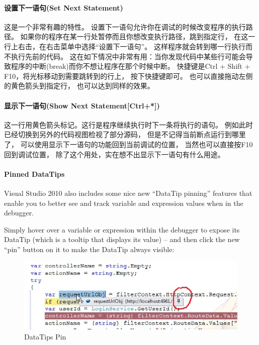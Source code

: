 \documentclass{book}
\begin{document}
\paragraph{设置下一语句(Set Next Statement)}这是一个非常有趣的特性。
设置下一语句允许你在调试的时候改变程序的执行路径。
如果你的程序在某一行处暂停而且你想改变执行路径，跳到指定行，
在这一行上右击，在右击菜单中选择“设置下一语句”。
这样程序就会转到哪一行执行而不执行先前的代码。
这在如下情况中非常有用：当你发现代码中某些行可能会导致程序的中断(break)而你不想让程序在那个时候中断。
快捷键是Ctrl + Shift + F10，将光标移动到需要跳转到的行上，
按下快捷键即可。
也可以直接拖动左侧的黄色箭头到指定行，
也可以达到同样的效果。

\paragraph{显示下一语句(Show Next Statement[Ctrl+*])}
这一行用黄色箭头标记。这行是程序继续执行时下一条将执行的语句。
例如此时已经切换到另外的代码视图检视了部分源码，
但是不记得当前断点运行到哪里了，
可以使用显示下一语句的功能回到当前调试的位置，
当然也可以直接按F10回到调试位置，
除了这个用处，实在想不出显示下一语句有什么用途。

\paragraph{Pinned DataTips}Visual Studio 2010 also includes some nice new “DataTip pinning” features that enable you to better see and track variable and expression values when in the debugger. 

Simply hover over a variable or expression within the debugger to expose its DataTip (which is a tooltip that displays its value)  – and then click the new “pin” button on it to make the DataTip always visible:

\begin{figure}[htbp]
	\centering
	\includegraphics[scale=0.8]{VisualStudioDataPin.jpg}
	\caption{DataTips Pin}
	\label{fig:VisualStudioDataPin}
\end{figure}
\end{document}
